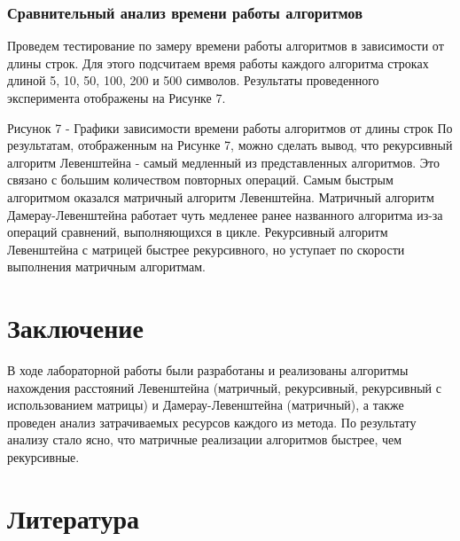 \documentclass[12pt]{report}
\begin{document}
\subsection{Сравнительный анализ времени работы алгоритмов}
Проведем тестирование по замеру времени работы алгоритмов в зависимости от длины строк. Для этого подсчитаем время работы каждого алгоритма строках длиной 5, 10, 50, 100, 200 и 500 символов. Результаты проведенного эксперимента отображены на Рисунке 7.

{}

Рисунок 7 - Графики зависимости времени работы алгоритмов от длины строк
\newline\newline
По результатам, отображенным на Рисунке 7, можно сделать вывод, что рекурсивный алгоритм Левенштейна - самый медленный из представленных алгоритмов. Это связано с большим количеством повторных операций. Самым быстрым алгоритмом оказался  матричный алгоритм Левенштейна. Матричный алгоритм Дамерау-Левенштейна работает чуть медленее ранее названного алгоритма из-за операций сравнений, выполняющихся в цикле. Рекурсивный алгоритм Левенштейна с матрицей быстрее рекурсивного, но уступает по скорости выполнения матричным алгоритмам. 

\chapter*{Заключение}
В ходе лабораторной работы были разработаны и реализованы алгоритмы нахождения расстояний
Левенштейна (матричный, рекурсивный, рекурсивный с использованием матрицы) и Дамерау-Левенштейна (матричный), а также проведен анализ затрачиваемых ресурсов каждого из метода. По результату анализу стало ясно, что матричные реализации алгоритмов быстрее, чем рекурсивные.

\chapter*{Литература}
\end{document}
